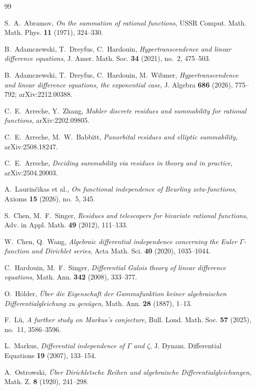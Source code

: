 \documentclass[11pt,a4paper]{amsart}
\theoremstyle{plain}
\theoremstyle{definition}
\begin{document}
\begin{thebibliography}{99}

S.~A.~Abramov,
\emph{On the summation of rational functions},
USSR Comput. Math. Math. Phys. \textbf{11} (1971), 324--330.

B.~Adamczewski, T.~Dreyfus, C.~Hardouin,
\emph{Hypertranscendence and linear difference equations},
J. Amer. Math. Soc. \textbf{34} (2021), no.~2, 475--503.

B.~Adamczewski, T.~Dreyfus, C.~Hardouin, M.~Wibmer,
\emph{Hypertranscendence and linear difference equations, the exponential case},
J. Algebra \textbf{686} (2026), 775--792; arXiv:2212.00388.

C.~E.~Arreche, Y.~Zhang,
\emph{Mahler discrete residues and summability for rational functions},
arXiv:2202.09805.

C.~E.~Arreche, M.~W.~Babbitt,
\emph{Panorbital residues and elliptic summability},
arXiv:2508.18247.

C.~E.~Arreche,
\emph{Deciding summability via residues in theory and in practice},
arXiv:2504.20003.

A.~Laurin\v{c}ikas et al.,
\emph{On functional independence of Beurling zeta-functions},
Axioms \textbf{15} (2026), no.~5, 345.

S.~Chen, M.~F.~Singer,
\emph{Residues and telescopers for bivariate rational functions},
Adv. in Appl. Math. \textbf{49} (2012), 111--133.

W.~Chen, Q.~Wang,
\emph{Algebraic differential independence concerning the Euler $\Gamma$-function and Dirichlet
series},
Acta Math. Sci. \textbf{40} (2020), 1035--1044.

C.~Hardouin, M.~F.~Singer,
\emph{Differential Galois theory of linear difference equations},
Math. Ann. \textbf{342} (2008), 333--377.

O.~H\"older,
\emph{\"Uber die Eigenschaft der Gammafunktion keiner algebraischen Differentialgleichung zu
gen\"ugen},
Math. Ann. \textbf{28} (1887), 1--13.

F.~L\"u,
\emph{A further study on Markus's conjecture},
Bull. Lond. Math. Soc. \textbf{57} (2025), no.~11, 3586--3596.

L.~Markus,
\emph{Differential independence of $\Gamma$ and $\zeta$},
J. Dynam. Differential Equations \textbf{19} (2007), 133--154.

A.~Ostrowski,
\emph{\"Uber Dirichletsche Reihen und algebraische Differentialgleichungen},
Math. Z. \textbf{8} (1920), 241--298.

\end{thebibliography}
\end{document}
